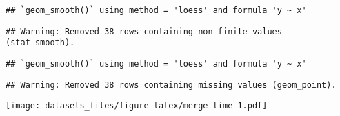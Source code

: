 \documentclass[]{article}
\begin{document}
\begin{verbatim}
## `geom_smooth()` using method = 'loess' and formula 'y ~ x'
\end{verbatim}

\begin{verbatim}
## Warning: Removed 38 rows containing non-finite values (stat_smooth).
\end{verbatim}

\begin{verbatim}
## `geom_smooth()` using method = 'loess' and formula 'y ~ x'
\end{verbatim}

\begin{verbatim}
## Warning: Removed 38 rows containing missing values (geom_point).
\end{verbatim}

\texttt{[image: datasets\_files/figure-latex/merge time-1.pdf]}
\end{document}
